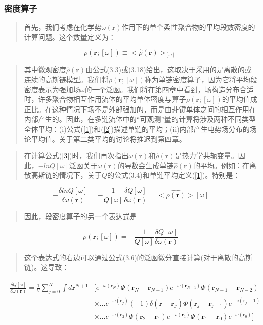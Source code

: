 \subsubsection{密度算子}
\begin{quotation}
首先，我们考虑在化学势$\omega(\mathbf{r})$作用下的单个柔性聚合物的平均段数密度的计算问题。这个数量定义为：
\end{quotation}
\begin{equation}\label{3}
\rho(\mathbf{r};[\omega])\equiv<\hat{\rho}(\mathbf{r})>_{[\omega]}
\end{equation}
\begin{quotation}
其中微观密度$\hat{\rho}(\mathbf{r})$由公式(3.3)或(3.18)给出，这取决于采用的是离散的或连续的高斯链模型。我们将$\rho(\mathbf{r};[\omega])$称为单链密度算子，因为它将平均段密度表示为强加场$\omega$的一个泛函。我们将在第四章中看到，场构造分布合适时，许多聚合物相互作用流体的平均单体密度与算子$\rho(\mathbf{r};[\omega])$的平均值成正比。在这种情况下场不是外部强加的，而是由非键单体之间的相互作用在内部产生的。因此，在多链流体中的“可观测”量的计算将涉及两种不同类型全体平均：(i)公式(\ref{1})和(\ref{2})描述单链的平均；(ii)内部产生电势场分布的场论平均值。关于第二类平均的讨论将推迟到第四章。
\end{quotation}
\begin{quotation}
在计算公式(\ref{3})时，我们再次指出$\omega(\mathbf{r})$和$\hat{\rho}(\mathbf{r})$是热力学共轭变量。因此，$-lnQ[\omega]$泛函关于$\omega(\mathbf{r})$的导数会生成单链$\hat{\rho}(\mathbf{r})$的平均。例如：在离散高斯链的情况下，关于$Q$的公式(3.4)和单链平均定义(\ref{1})。特别是：
\end{quotation}
\begin{equation}\label{4}
-\frac{\delta lnQ[\omega]}{\delta \omega(\mathbf{r})}=-\frac{1}{Q[\omega]}\frac{\delta Q[\omega]}{\delta \omega(\mathbf{r})}=<\hat{\rho(\mathbf{r})}>[\omega]
\end{equation}
\begin{quotation}
因此，段密度算子的另一个表达式是
\end{quotation}
\begin{equation}\label{5}
\rho(\mathbf{r};[\omega])=-\frac{1}{Q[\omega]}\frac{\delta Q[\omega]}{\delta \omega(\mathbf{r})}
\end{equation}
\begin{quotation}
这个表达式的右边可以通过公式(3.6)的泛函微分直接计算(对于离散的高斯链)。这导致：
\end{quotation}
\begin{align}\label{6}
\begin{split}
\frac{\delta Q[\omega]}{\delta \omega(\mathbf{r})}=\frac{1}{V}\sum_{j=0}^{N}\int d\mathbf{r}^{N+1}&[e^{-\omega(\mathbf{r}_{N})}\Phi(\mathbf{r}_{N}-\mathbf{r}_{N-1})e^{-\omega(\mathbf{r}_{N-1})}\Phi(\mathbf{r}_{N-1}-\mathbf{r}_{N-2}) \\ &\times \ldots e^{-\omega(\mathbf{r}_{j})}(-1)\delta(\mathbf{r}-\mathbf{r}_j)\Phi(\mathbf{r}_j-\mathbf{r}_{j-1})e^{-\omega(\mathbf{r}_j-1)}\\ & \times \ldots e^{-\omega(\mathbf{r}_{2})}\Phi(\mathbf{r}_{2}-\mathbf{r}_{1})e^{-\omega(\mathbf{r}_{1})}\Phi(\mathbf{r}_{1}-\mathbf{r}_{0})e^{-\omega(\mathbf{r}_{0})}]
\end{split}
\end{align}
